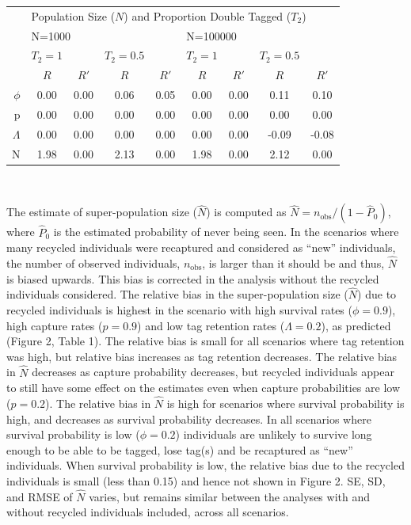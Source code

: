 \documentclass[]{article}
\begin{document}
\begin{table}[ht]
\centering
\begin{tabular}{rcccccccc}
  \hline
  & \multicolumn{8}{l}{Population Size ($N$) and Proportion Double Tagged ($T_2$)} \\
  \cline{2-9}
  & \multicolumn{4}{l}{N=1000} & \multicolumn{4}{l}{N=100000} \\
  \cline {2-9}
 & $T_2=1$ && $T_2=0.5$ && $T_2=1$ && $T_2=0.5$ &  \\ 
  \cline {2-9}
  & $R$ & $R'$ & $R$ & $R'$ & $R$ & $R'$ & $R$ & $R'$ \\ 
  \hline
$\phi$ & 0.00 & 0.00 & 0.06 & 0.05 & 0.00 & 0.00 & 0.11 & 0.10 \\ 
  p & 0.00 & 0.00 & 0.00 & 0.00 & 0.00 & 0.00 & 0.00 & 0.00 \\ 
  $\Lambda$ & 0.00 & 0.00 & 0.00 & 0.00 & 0.00 & 0.00 & -0.09 & -0.08 \\ 
  N & 1.98 & 0.00 & 2.13 & 0.00 & 1.98 & 0.00 & 2.12 & 0.00 \\ 
   \hline
\end{tabular}
\end{table}

~ ~

The estimate of super-population size (\(\hat{N}\)) is computed as
\(\hat{N}=n_{\text{obs}}/{(1-\hat{P}_0)}\), where \(\hat{P}_0\) is the
estimated probability of never being seen. In the scenarios where many
recycled individuals were recaptured and considered as ``new''
individuals, the number of observed individuals, \(n_{\text{obs}}\), is larger than it should  be and thus,
\(\hat{N}\) is biased upwards. This bias is corrected in the analysis
without the recycled individuals considered. The relative bias in the
super-population size (\(\hat{N}\)) due to recycled individuals is 
highest in the scenario with high survival rates (\(\phi=0.9\)), high
capture rates (\(p=0.9\)) and low tag retention rates (\(\Lambda=0.2\)),
as predicted (Figure 2, Table 1). The relative bias is small for all
scenarios where tag retention was high, but relative bias increases as
tag retention decreases. The relative bias in \(\hat{N}\) decreases as
capture probability decreases, but recycled individuals appear to still
have some effect on the estimates even when capture probabilities
are low (\(p=0.2\)). The relative bias in \(\hat{N}\) is high for
scenarios where survival probability is high, and decreases as
survival probability decreases. In all scenarios where survival probability is
low (\(\phi=0.2\)) individuals are unlikely to survive long enough to be
able to be tagged, lose tag(s) and be recaptured as  ``new''
individuals. When survival probability is low, the relative bias due to the recycled
individuals is small (less than 0.15) and hence not shown in Figure 2.
SE, SD, and RMSE of \(\hat{N}\) varies, but remains similar between the
analyses with and without recycled individuals included, across all
scenarios.
\end{document}
